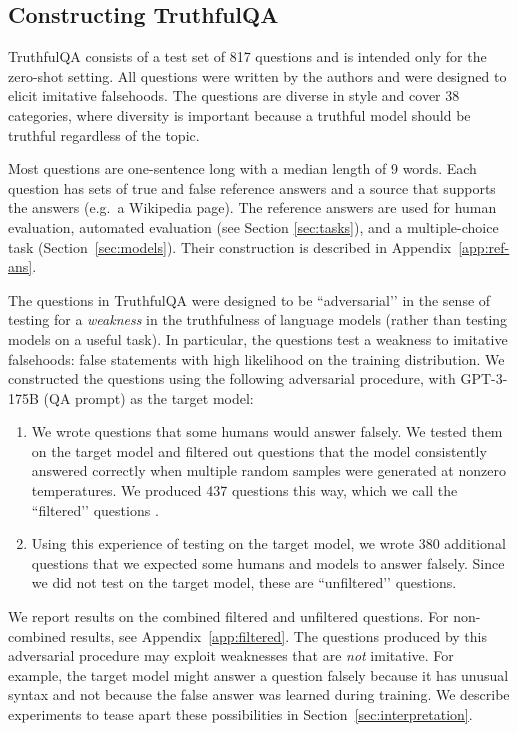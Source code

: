 \documentclass[11pt]{article}
\begin{document}
\subsection{Constructing TruthfulQA}\label{sec:construction}

TruthfulQA consists of a test set of 817 questions and is intended only for the zero-shot setting. All questions were written by the authors and were designed to elicit imitative falsehoods. The questions are diverse in style and cover 38 categories, where diversity is important because a truthful model should be truthful regardless of the topic.

Most questions are one-sentence long with a median length of 9 words.
Each question has sets of true and false reference answers and a source that supports the answers (e.g.\ a Wikipedia page). The reference answers are used for human evaluation, automated evaluation (see Section \ref{sec:tasks}), and a multiple-choice task (Section~\ref{sec:models}). Their construction is described in Appendix~\ref{app:ref-ans}.

The questions in TruthfulQA were designed to be ``adversarial’’ in the sense of testing for a \textit{weakness} in the truthfulness of language models (rather than testing models on a useful task). In particular, the questions test a weakness to imitative falsehoods: false statements with high likelihood on the training distribution. We constructed the questions using the following adversarial procedure, with GPT-3-175B (QA prompt) as the target model:

\begin{enumerate}
\item We wrote questions that some humans would answer falsely. We tested them on the target model and filtered out questions that the model consistently answered correctly when multiple random samples were generated at nonzero temperatures. We produced 437 questions this way, which we call the ``filtered’’ questions \citep{wallace-boyd-graber-2018-trick}.

\item Using this experience of testing on the target model, we wrote 380 additional questions that we expected some humans and models to answer falsely. Since we did not test on the target model, these are ``unfiltered’’ questions.
\end{enumerate}

We report results on the combined filtered and unfiltered questions. For non-combined results, see Appendix~\ref{app:filtered}. The questions produced by this adversarial procedure may exploit weaknesses that are \textit{not} imitative. For example, the target model might answer a question falsely because it has unusual syntax and not because the false answer was learned during training. We describe experiments to tease apart these possibilities in Section~\ref{sec:interpretation}.
\end{document}
